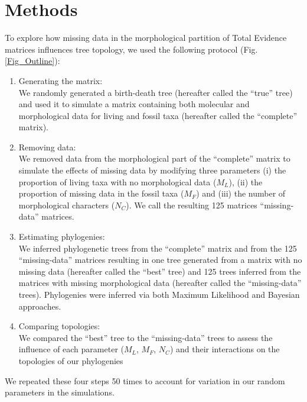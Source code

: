\section{Methods}
To explore how missing data in the morphological partition of Total Evidence matrices influences tree topology, we used the following protocol (Fig. \ref{Fig_Outline}):
\begin{enumerate}
\item{Generating the matrix:} \label{step:generate_matrix} \\
We randomly generated a birth-death tree (hereafter called the ``true'' tree) and used it to simulate a matrix containing both molecular and morphological data for living and fossil taxa (hereafter called the ``complete'' matrix).
\item{Removing data:} \label{step:remove_data} \\
We removed data from the morphological part of the ``complete'' matrix to simulate the effects of missing data by modifying three parameters (i) the proportion of living taxa with no morphological data ($M_{L}$), (ii) the proportion of missing data in the fossil taxa ($M_{F}$) and (iii) the number of morphological characters ($N_{C}$). We call the resulting 125 matrices ``missing-data'' matrices.
\item{Estimating phylogenies:} \label{step:build_phylo} \\
We inferred phylogenetic trees from the ``complete'' matrix and from the 125 ``missing-data'' matrices resulting in one tree generated from a matrix with no missing data (hereafter called the ``best'' tree) and 125 trees inferred from the matrices with missing morphological data (hereafter called the ``missing-data'' trees). Phylogenies were inferred via both Maximum Likelihood and Bayesian approaches.
\item{Comparing topologies:} \label{step:compare_topo} \\
We compared the ``best'' tree to the ``missing-data'' trees to assess the influence of each parameter ($M_{L}$, $M_{F}$, $N_{C}$) and their interactions on the topologies of our phylogenies
\end{enumerate}
We repeated these four steps 50 times to account for variation in our random parameters in the simulations.

